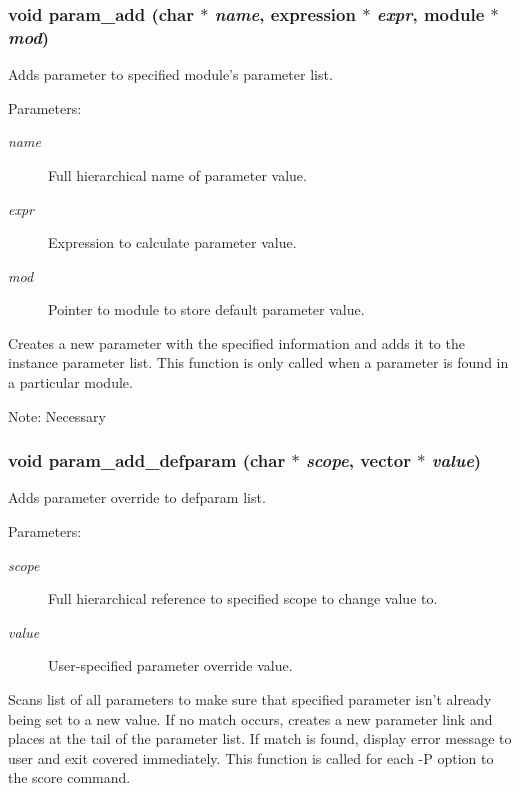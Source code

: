\subsubsection{\setlength{\rightskip}{0pt plus 5cm}void param\_\-add (char $\ast$ {\em name}, {\bf expression} $\ast$ {\em expr}, {\bf module} $\ast$ {\em mod})}\label{param_8c_a5}


Adds parameter to specified module's parameter list.

\begin{Desc}
\item[Parameters: ]\par
\begin{description}
\item[{\em 
name}]Full hierarchical name of parameter value. \item[{\em 
expr}]Expression to calculate parameter value. \item[{\em 
mod}]Pointer to module to store default parameter value.\end{description}
\end{Desc}
Creates a new parameter with the specified information and adds it to the  instance parameter list. This function is only called when a parameter is found in a particular module.

Note: Necessary 
\subsubsection{\setlength{\rightskip}{0pt plus 5cm}void param\_\-add\_\-defparam (char $\ast$ {\em scope}, {\bf vector} $\ast$ {\em value})}\label{param_8c_a6}


Adds parameter override to defparam list.

\begin{Desc}
\item[Parameters: ]\par
\begin{description}
\item[{\em 
scope}]Full hierarchical reference to specified scope to change value to. \item[{\em 
value}]User-specified parameter override value.\end{description}
\end{Desc}
Scans list of all parameters to make sure that specified parameter isn't already being set to a new value. If no match occurs, creates a new parameter link and places at the tail of the parameter list. If match is found, display error message to user and exit covered immediately. This function is called for each -P option to the score command.

